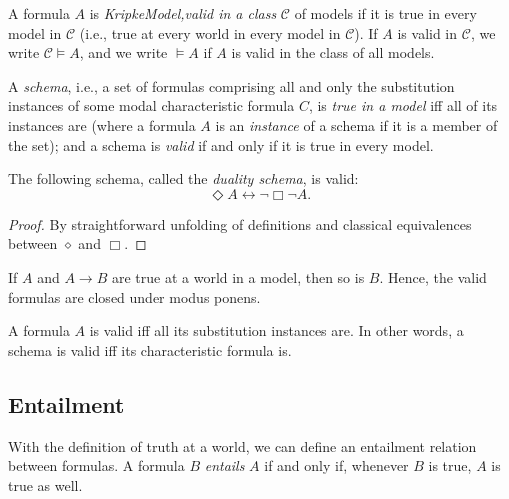 \begin{definition}
  \label{valid-in-class}
  A formula $A$ is \emph{KripkeModel,valid in a class} $\mathcal{C}$ 
of models if it is true in every model in $\mathcal{C}$ (i.e., true at every 
world in every model in $\mathcal{C}$). If $A$ is valid in $\mathcal{C}$, we 
write $\mathcal{C} \vDash A$, and we write $\vDash A$ if $A$ is valid in the 
class of all models.
\end{definition}

\begin{definition}
  \label{valid-schema}
A \emph{schema}, i.e., a set of formulas comprising all and 
only the substitution instances of some modal characteristic formula $C$, 
is \emph{true in a model} iff all of its instances are 
(where a formula $A$ is an \emph{instance} of a schema if it is a 
member of the set); and a schema is \emph{valid} if and only if it is 
true in every model.
\end{definition}

\begin{proposition}
  \label{duality-schema}
  \leanok
The following schema, called the \emph{duality schema}, is valid:
\[
\Diamond A \leftrightarrow \neg \Box \neg A.
\]
\end{proposition}
\begin{proof}
  \label{proof:duality-schema}
  \leanok
  By straightforward unfolding of definitions and classical equivalences between \(\diamond\) and \(\Box\).
\end{proof}

\begin{proposition}
  \label{modus-ponens-validity}
  If $A$ and $A \rightarrow B$ are true at a world in a model,
  then so is $B$. Hence, the valid formulas are closed under modus ponens.
\end{proposition}

\begin{proposition}
  \label{substitution-validity}
  A formula $A$ is valid iff all its substitution instances are.
  In other words, a schema is valid iff its characteristic formula is.
\end{proposition}

\subsection{Entailment}
With the definition of truth at a world, we can define an entailment
relation between formulas. A formula $B$ \emph{entails} $A$ if and only if, whenever
$B$ is true, $A$ is true as well.

